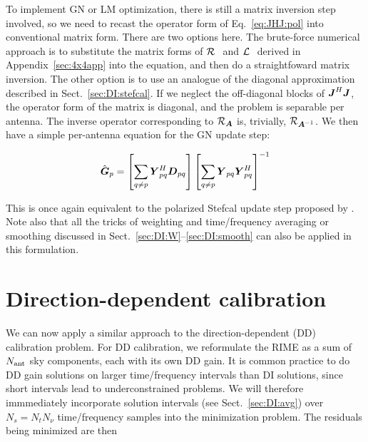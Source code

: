 \documentclass[useAMS,usenatbib]{mn2e}
\newcommand{\mat}[1]{{\bmath{#1}}}
\newcommand{\JJ}{\mat{J}} %
\newcommand{\DD}{\mat{D}}
\newcommand{\MM}{\mat{M}}
\newcommand{\GG}{\mat{G}}
\newcommand{\JHJ}{\JJ^H\JJ} %
\begin{document}
To implement GN or LM optimization, there is still a matrix inversion step involved, so we need to recast the operator 
form of Eq.~\ref{eq:JHJ:pol} into conventional matrix form. There are two options here. The brute-force numerical
approach is to substitute the matrix forms of $\mathcal{R}_{{~}}$ and $\mathcal{L}_{{~}}$ derived in Appendix~\ref{sec:4x4app} into the equation, 
and then do a straightfoward matrix inversion. The other option is to use an analogue of the diagonal approximation described in 
Sect.~\ref{sec:DI:stefcal}. If we neglect the off-diagonal blocks of $\JHJ$, the operator form of the matrix is 
diagonal, and the problem is separable per antenna. The inverse operator corresponding to $\Rop{\mat{A}}$ is, 
trivially, $\Rop{\mat{A}^{-1}}$. We then have a simple per-antenna equation for the GN update step:

\begin{equation}
\label{eq:update:DI:diag:pol}
\hat{\GG}_p = \left [ \sum\limits_{q\ne p} \YY^H_{pq} \DD_{pq} \right ] 
\left [ \sum\limits_{q\ne p} \YY_{pq} \YY^H_{pq}  \right ]^{-1}
\end{equation}

This is once again equivalent to the polarized Stefcal update step proposed by \citet{Stefcal}. Note also that all 
the tricks of weighting and time/frequency averaging or smoothing discussed in Sect.~\ref{sec:DI:W}--\ref{sec:DI:smooth} 
can also be applied in this formulation.


\section{Direction-dependent calibration}

\newcommand{\Ns}{N_s}

We can now apply a similar approach to the direction-dependent (DD) calibration problem. For DD calibration, we reformulate
the RIME as a sum of $N_\mathrm{ant}$ sky components, each with its own DD gain. 
It is common practice to do DD gain solutions on larger time/frequency intervals than DI 
solutions, since short intervals lead to underconstrained
problems. We will therefore immmediately incorporate solution intervals (see Sect.~\ref{sec:DI:avg}) 
over $\Ns=N_t N_\nu$ time/frequency samples into the  minimization problem. The residuals being minimized
are then

\newcommand{\GGd}{\GG^{(d)}}
\newcommand{\GGdH}{\GG^{(d)H}}
\newcommand{\MMd}{\MM^{(d)}}
\newcommand{\YYd}{\YY^{(d)}}
\newcommand{\YYdH}{\YY^{(d)H}}
\newcommand{\YYc}{\YY^{(c)}}
\newcommand{\YYcH}{\YY^{(c)H}}
\newcommand{\ggd}{g^{(d)}}
\newcommand{\ggdH}{\bar{g}^{(d)}}
\newcommand{\ggc}{g^{(c)}}
\newcommand{\ggcH}{\bar{g}^{(c)}}
\newcommand{\mmc}{m^{(c)}}
\newcommand{\mmd}{m^{(d)}}
\newcommand{\mmcH}{\bar{m}^{(c)}}
\newcommand{\mmdH}{\bar{m}^{(d)}}
\newcommand{\yyd}{y^{(d)}}
\newcommand{\yydH}{\bar{y}^{(d)}}
\newcommand{\yyc}{y^{(c)}}
\newcommand{\yycH}{\bar{y}^{(c)}}
\end{document}
